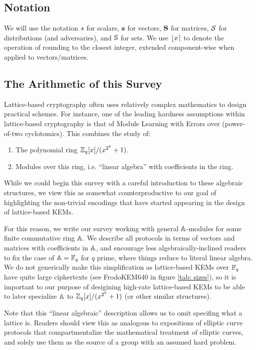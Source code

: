 \subsection{Notation}
We will use the notation $\scalarfont{s}$ for scalars, $\mathbf{s}$ for vectors, $\mathbf{S}$ for matrices, $\mathcal{S}$ for distributions (and adversaries), and $\mathbb{S}$ for sets.
We use $\left\lfloor x\right\rceil$ to denote the operation of rounding to the closest integer, extended component-wise when applied to vectors/matrices.
\subsection{The Arithmetic of this Survey}
Lattice-based cryptography often uses relatively complex mathematics to design practical schemes.
For instance, one of the leading hardness assumptions within lattice-based cryptography is that of Module Learning with Errors over (power-of-two cyclotomics).
This combines the study of:
\begin{enumerate}
	\item The polynomial ring $\mathbb{Z}_q[x] / (x^{2^k}+1)$.
	\item Modules over this ring, i.e. ``linear algebra'' with coefficients in the ring.
\end{enumerate}
While we could begin this survey with a careful introduction to these algebraic structures, we view this as somewhat counterproductive to our goal of highlighting the non-trivial encodings that have started appearing in the design of lattice-based KEMs.

For this reason, we write our survey working with general $\mathbb{A}$-modules for some finite commutative ring $\mathbb{A}$.
We describe all protocols in terms of vectors and matrices with coefficients in $\mathbb{A}$, and encourage less algebraically-inclined readers to fix the case of $\mathbb{A} = \mathbb{F}_q$ for $q$ prime, where things reduce to literal linear algebra.
We do not generically make this simplification as lattice-based KEMs over $\mathbb{F}_q$ have quite large ciphertexts (see FrodoKEM640 in figure \ref{tab: sizes}), so it is important to our purpose of desigining high-rate lattice-based KEMs to be able to later specialize $\mathbb{A}$ to $\mathbb{Z}_q[x] / (x^{2^k}+1)$ (or other similar structures).

Note that this ``linear algebraic'' description allows us to omit specifing what a lattice is.
Readers should view this as analogous to expositions of elliptic curve protocols that compartmentalize the mathematical treatment of elliptic curves, and solely use them as the source of a group with an assumed hard problem.


